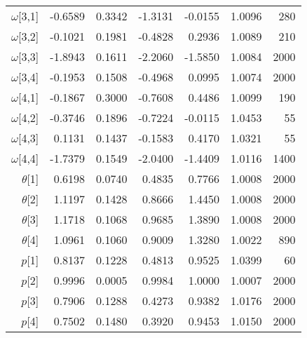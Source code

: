 \documentclass[11pt]{article}
\begin{document}
\begin{table}[ht]
\begin{tabular}{rrrrrrr}
  $\omega$[3,1] & -0.6589 & 0.3342 & -1.3131 & -0.0155 & 1.0096 &   280 \\ 
  $\omega$[3,2] & -0.1021 & 0.1981 & -0.4828 & 0.2936 & 1.0089 &   210 \\ 
  $\omega$[3,3] & -1.8943 & 0.1611 & -2.2060 & -1.5850 & 1.0084 &  2000 \\ 
  $\omega$[3,4] & -0.1953 & 0.1508 & -0.4968 & 0.0995 & 1.0074 &  2000 \\ 
  $\omega$[4,1] & -0.1867 & 0.3000 & -0.7608 & 0.4486 & 1.0099 &   190 \\ 
  $\omega$[4,2] & -0.3746 & 0.1896 & -0.7224 & -0.0115 & 1.0453 &    55 \\ 
  $\omega$[4,3] & 0.1131 & 0.1437 & -0.1583 & 0.4170 & 1.0321 &    55 \\ 
  $\omega$[4,4] & -1.7379 & 0.1549 & -2.0400 & -1.4409 & 1.0116 &  1400 \\ 
   $\theta$[1] & 0.6198 & 0.0740 & 0.4835 & 0.7766 & 1.0008 &  2000 \\ 
   $\theta$[2] & 1.1197 & 0.1428 & 0.8666 & 1.4450 & 1.0008 &  2000 \\ 
   $\theta$[3] & 1.1718 & 0.1068 & 0.9685 & 1.3890 & 1.0008 &  2000 \\ 
  $\theta$[4] & 1.0961 & 0.1060 & 0.9009 & 1.3280 & 1.0022 &   890 \\ 
  $p$[1] & 0.8137 & 0.1228 & 0.4813 & 0.9525 & 1.0399 &    60 \\ 
  $p$[2] & 0.9996 & 0.0005 & 0.9984 & 1.0000 & 1.0007 &  2000 \\ 
  $p$[3] & 0.7906 & 0.1288 & 0.4273 & 0.9382 & 1.0176 &  2000 \\ 
  $p$[4] & 0.7502 & 0.1480 & 0.3920 & 0.9453 & 1.0150 &  2000 \\ 
   \hline
\end{tabular}
\end{table}
\end{document}
